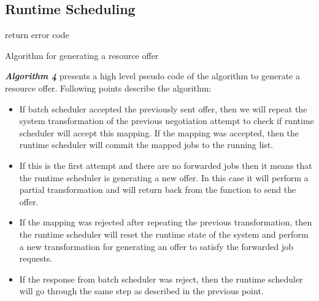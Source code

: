 \subsection{Runtime Scheduling}
\begin{algorithm}[!htbp]
 \DontPrintSemicolon
 return error code\; 
 \caption{Algorithm for generating a resource offer}
\end{algorithm}
\noindent
\textbf{\textit{Algorithm 4}} presents a high level pseudo code of the algorithm to generate a resource offer. Following points describe the algorithm:
\begin{itemize}
\item If batch scheduler accepted the previously sent offer, then we will repeat the system transformation of the previous negotiation attempt to check if runtime scheduler will accept this mapping. If the mapping was accepted, then the runtime scheduler will commit the mapped jobs to the running list. 
\item If this is the first attempt and there are no forwarded jobs then it means that the runtime scheduler is generating a new offer. In this case it will perform a partial transformation and will return back from the function to send the offer.
\item If the mapping was rejected after repeating the previous transformation, then the runtime scheduler will reset the runtime state of the system and perform a new transformation for generating an offer to satisfy the forwarded job requests.
\item If the response from batch scheduler was reject, then the runtime scheduler will go through the same step as described in the previous point.
\end{itemize}
